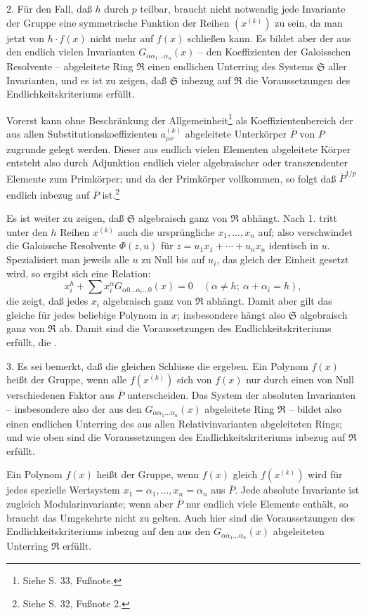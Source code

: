 2. Für den Fall, daß $h$ durch $p$ teilbar, braucht nicht notwendig jede Invariante der Gruppe eine symmetrische Funktion der Reihen $(x^{(k)})$ zu sein, da man jetzt von $h\cdot f(x)$ nicht mehr auf $f(x)$ schließen kann. Es bildet aber der aus den endlich vielen Invarianten $G_{\alpha\alpha_1\ldots\alpha_n}(x)$ -- den Koeffizienten der Galoisschen Resolvente -- abgeleitete Ring $\mathfrak R$ einen endlichen Unterring des Systems $\mathfrak S$ aller Invarianten, und es ist zu zeigen, daß $\mathfrak S$ inbezug auf $\mathfrak R$ die Voraussetzungen des Endlichkeitskriteriums erfüllt.

Vorerst kann ohne Beschränkung der Allgemeinheit\footnote{Siehe S. 33, Fußnote.} als Koeffizientenbereich der aus allen Substitutionskoeffizienten $a_{\mu\nu}^{(k)}$ abgeleitete Unterkörper $\overline P$ von $P$ zugrunde gelegt werden. Dieser aus endlich vielen Elementen abgeleitete Körper entsteht also durch Adjunktion endlich vieler algebraischer oder transzendenter Elemente zum Primkörper; und da der Primkörper vollkommen, so folgt daß $\overline P^{1/p}$ endlich inbezug auf $\overline P$ ist.\footnote{Siehe S. 32, Fußnote 2.}

Es ist weiter zu zeigen, daß $\mathfrak S$ algebraisch ganz von $\mathfrak R$ abhängt. Nach 1. tritt unter den $h$ Reihen $x^{(k)}$ auch die ursprüngliche $x_1,\ldots,x_n$ auf; also verschwindet die Galoissche Resolvente $\Phi(z,u)$ für $z=u_1x_1+\cdots+u_nx_n$ identisch in $u$. Spezialisiert man jeweils alle $u$ zu Null bis auf $u_i$, das gleich der Einheit gesetzt wird, so ergibt sich eine Relation:
\[
 x_i^h+\sum x_i^\alpha G_{\alpha0\ldots\alpha_i\ldots0}(x)=0
 \quad (\alpha\ne h;\ \alpha+\alpha_i=h),
\]
die zeigt, daß jedes $x_i$ algebraisch ganz von $\mathfrak R$ abhängt. Damit aber gilt das gleiche für jedes beliebige Polynom in $x$; insbesondere hängt also $\mathfrak S$ algebraisch ganz von $\mathfrak R$ ab. Damit sind die Voraussetzungen des Endlichkeitskriteriums erfüllt, die .

3. Es sei bemerkt, daß die gleichen Schlüsse die  ergeben. Ein Polynom $f(x)$ heißt  der Gruppe, wenn alle $f(x^{(k)})$ sich von $f(x)$ nur durch einen von Null verschiedenen Faktor aus $\overline P$ unterscheiden. Das System der absoluten Invarianten -- insbesondere also der aus den $G_{\alpha\alpha_1\ldots\alpha_n}(x)$ abgeleitete Ring $\mathfrak R$ -- bildet also einen endlichen Unterring des aus allen Relativinvarianten abgeleiteten Rings; und wie oben sind die Voraussetzungen des Endlichkeitskriteriums inbezug auf $\mathfrak R$ erfüllt.

Ein Polynom $f(x)$ heißt  der Gruppe, wenn $f(x)$ gleich $f(x^{(k)})$ wird für jedes spezielle Wertsystem $x_1=\alpha_1,\ldots,x_n=\alpha_n$ aus $\overline P$. Jede absolute Invariante ist zugleich Modularinvariante; wenn aber $\overline P$ nur endlich viele Elemente enthält, so braucht das Umgekehrte nicht zu gelten. Auch hier sind die Voraussetzungen des Endlichkeitskriteriums inbezug auf den aus den $G_{\alpha\alpha_1\ldots\alpha_n}(x)$ abgeleiteten Unterring $\mathfrak R$ erfüllt.


\clearpage
